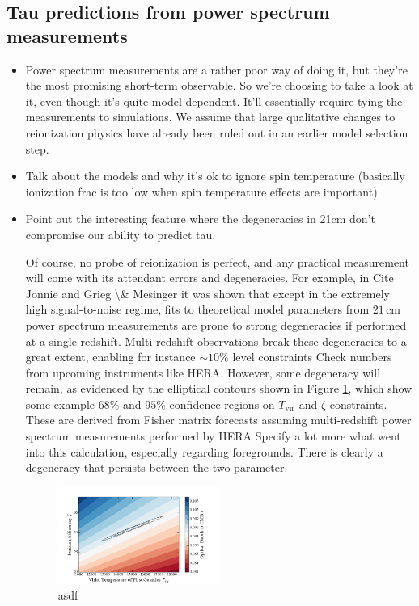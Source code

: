 \documentclass[twocolumn,aps,prd,nofootinbib,showpacs]{revtex4-1}
\begin{document}
\subsection{Tau predictions from power spectrum measurements}
\begin{itemize}
\item Power spectrum measurements are a rather poor way of doing it, but they're the most promising short-term observable. So we're choosing to take a look at it, even though it's quite model dependent. It'll essentially require tying the measurements to simulations. We assume that large qualitative changes to reionization physics have already been ruled out in an earlier model selection step.
\item Talk about the models and why it's ok to ignore spin temperature (basically ionization frac is too low when spin temperature effects are important)
\item Point out the interesting feature where the degeneracies in 21cm don't compromise our ability to predict tau.

Of course, no probe of reionization is perfect, and any practical measurement will come with its attendant errors and degeneracies. For example, in \acl{Cite Jonnie and Grieg \& Mesinger} it was shown that except in the extremely high signal-to-noise regime, fits to theoretical model parameters from $21\,\textrm{cm}$ power spectrum measurements are prone to strong degeneracies if performed at a single redshift. Multi-redshift observations break these degeneracies to a great extent, enabling for instance $\sim 10\%$ level constraints \acl{Check numbers} from upcoming instruments like HERA. However, some degeneracy will remain, as evidenced by the elliptical contours shown in Figure \ref{fig:21cmDegen_wTau}, which show some example $68\%$ and $95\%$ confidence regions on $T_\textrm{vir}$ and $\zeta$ constraints. These are derived from Fisher matrix forecasts assuming multi-redshift power spectrum measurements performed by HERA \acl{Specify a lot more what went into this calculation, especially regarding foregrounds}. There is clearly a degeneracy that persists between the two parameter.

\begin{figure}[!]
	\centering
	\includegraphics[width=0.5\textwidth]{figures/21cmDegen_wTau.png}
	\caption{asdf}
	\label{fig:21cmDegen_wTau}
\end{figure}


\end{itemize}
\end{document}

